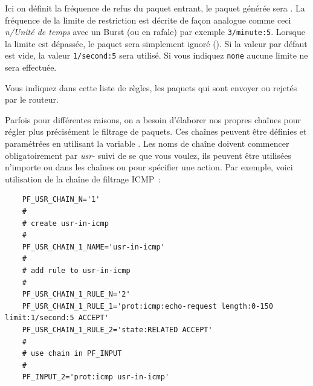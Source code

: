 \begin{description}
Ici on définit la fréquence de refus du paquet entrant, le paquet générée sera
. La fréquence de la limite de restriction est décrite de
façon analogue comme ceci \emph{n/Unité de temps} avec un Burst (ou en rafale)
par exemple \texttt{3/minute:5}. Lorsque la limite est dépassée, le paquet sera
simplement ignoré (). Si la valeur par défaut est vide, la valeur
\texttt{1/second:5} sera utilisé. Si vous indiquez \texttt{none} aucune limite
ne sera effectuée.

Vous indiquez dans cette liste de règles, les paquets qui sont envoyer
ou rejetés par le routeur.
\end{description}


Parfois pour différentes raisons, on a besoin d'élaborer nos propres chaînes
pour régler plus précisément le filtrage de paquets. Ces chaînes peuvent
être définies et paramétrées en utilisant la variable .
Les noms de chaîne doivent commencer obligatoirement par \emph{usr-} suivi de
se que vous voulez, ils peuvent être utilisées n'importe ou dans les chaînes
 ou  pour spécifier une action. Par exemple,
voici utilisation de la chaîne de filtrage ICMP~:

\begin{example}
{\footnotesize
\begin{verbatim}
    PF_USR_CHAIN_N='1'
    #
    # create usr-in-icmp
    #
    PF_USR_CHAIN_1_NAME='usr-in-icmp'
    #
    # add rule to usr-in-icmp
    #
    PF_USR_CHAIN_1_RULE_N='2'
    PF_USR_CHAIN_1_RULE_1='prot:icmp:echo-request length:0-150 limit:1/second:5 ACCEPT'
    PF_USR_CHAIN_1_RULE_2='state:RELATED ACCEPT'
    #
    # use chain in PF_INPUT
    #
    PF_INPUT_2='prot:icmp usr-in-icmp'
\end{verbatim}}
\end{example}

